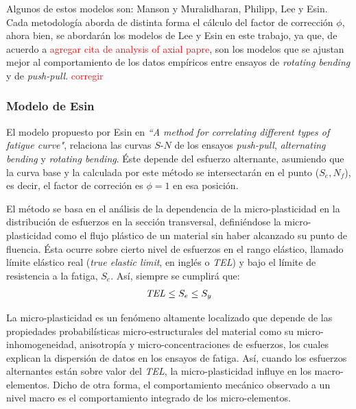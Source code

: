 Algunos de estos modelos son: Manson y Muralidharan, Philipp, Lee y Esin. Cada metodología aborda de distinta forma el cálculo del factor de corrección $\phi$, ahora bien, se abordarán los modelos de Lee y Esin en este trabajo, ya que, de acuerdo a \textcolor{red}{agregar cita de analysis of axial papre}, son los modelos que se ajustan mejor al comportamiento de los datos empíricos entre ensayos de \textit{rotating bending} y de \textit{push-pull}. \textcolor{red}{corregir}

\subsubsection{Modelo de Esin}
El modelo propuesto por Esin en \textit{``A method for correlating different types of fatigue curve"}, relaciona las curvas $S$-$N$ de los ensayos \textit{push-pull}, \textit{alternating bending} y \textit{rotating bending}. Éste depende del esfuerzo alternante, asumiendo que la curva base y la calculada por este método se intersectarán en el punto ($S_e,N_f$), es decir, el factor de correción es $\phi=1$ en esa posición. 

El método se basa en el análisis de la dependencia de la micro-plasticidad en la distribución de esfuerzos en la sección transversal, definiéndose la micro-plasticidad como el flujo plástico de un material sin haber alcanzado su punto de fluencia. Ésta ocurre sobre cierto nivel de esfuerzos en el rango elástico, llamado límite elástico real (\textit{true elastic limit}, en inglés o \textit{TEL}) y bajo el límite de resistencia a la fatiga, $S_e$. Así, siempre se cumplirá que:
\begin{align*}
	\text{\textit{TEL}} \leq S_e \leq S_y
\end{align*}

La micro-plasticidad es un fenómeno altamente localizado que depende de las propiedades probabilísticas micro-estructurales del material como su micro-inhomogeneidad, anisotropía y micro-concentraciones de esfuerzos, los cuales explican la dispersión de datos en los ensayos de fatiga. Así, cuando los esfuerzos alternantes están sobre valor del  \textit{TEL}, la micro-plasticidad influye en los macro-elementos. Dicho de otra forma, el comportamiento mecánico observado a un nivel macro es el comportamiento integrado de los micro-elementos.

